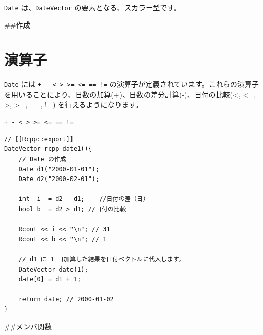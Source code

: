 \documentclass[]{book}
\newenvironment{Shaded}{\begin{snugshade}}{\end{snugshade}}
\newcommand{\CommentTok}[1]{\textcolor[rgb]{0.56,0.35,0.01}{\textit{#1}}}
\newcommand{\DecValTok}[1]{\textcolor[rgb]{0.00,0.00,0.81}{#1}}
\newcommand{\FloatTok}[1]{\textcolor[rgb]{0.00,0.00,0.81}{#1}}
\newcommand{\NormalTok}[1]{#1}
\newcommand{\SpecialCharTok}[1]{\textcolor[rgb]{0.00,0.00,0.00}{#1}}
\newcommand{\StringTok}[1]{\textcolor[rgb]{0.31,0.60,0.02}{#1}}
\begin{document}
\texttt{Date} は、\texttt{DateVector} の要素となる、スカラー型です。

\#\#作成

\begin{Shaded}
\end{Shaded}

\hypertarget{-1}{%
\section{演算子}\label{-1}}

\texttt{Date} には \texttt{+\ -\ \textless{}\ \textgreater{}\ \textgreater{}=\ \textless{}=\ ==\ !=} の演算子が定義されています。これらの演算子を用いることにより、日数の加算(+)、日数の差分計算(-)、日付の比較(\textless{}, \textless{}=, \textgreater{}, \textgreater{}=, ==, !=) を行えるようになります。

\texttt{+\ -\ \textless{}\ \textgreater{}\ \textgreater{}=\ \textless{}=\ ==\ !=}

\begin{verbatim}
// [[Rcpp::export]]
DateVector rcpp_date1(){
    // Date の作成
    Date d1("2000-01-01");
    Date d2("2000-02-01");

    int  i  = d2 - d1;    //日付の差（日）
    bool b  = d2 > d1; //日付の比較

    Rcout << i << "\n"; // 31
    Rcout << b << "\n"; // 1

    // d1 に 1 日加算した結果を日付ベクトルに代入します。
    DateVector date(1);
    date[0] = d1 + 1;  

    return date; // 2000-01-02
}
\end{verbatim}

\#\#メンバ関数
\end{document}
